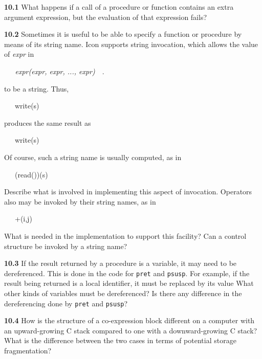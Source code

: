 \textbf{10.1 }What happens if a call of a procedure or function
contains an extra argument expression, but the evaluation of that
expression fails?


\textbf{10.2 }Sometimes it is useful to be able to specify a function
or procedure by means of its string name. Icon supports
{\textquotedbl}string invocation,{\textquotedbl} which allows the
value of \textit{expr} in

{\ttfamily\mdseries
\textit{\ \ \ expr(expr,
expr, ..., expr)}\ \ .}

\noindent to be a string. Thus,

{\ttfamily\mdseries
\ \ \ {\textquotedbl}write{\textquotedbl}(s)}

\noindent produces the same result as

{\ttfamily\mdseries
\ \ \ write(s)}

Of course, such a string name is usually computed, as in

{\ttfamily\mdseries
\ \ \ (read())(s)}


Describe what is involved in implementing this aspect of
invocation. Operators also may be invoked by their string names, as in

{\ttfamily\mdseries
\ \ \ {\textquotedbl}+{\textquotedbl}(i,j)}


What is needed in the implementation to support this facility? Can a
control structure be invoked by a string name?


\textbf{10.3 }If the result returned by a procedure is a variable, it
may need to be dereferenced. This is done in the code for
\texttt{pret} and \texttt{psusp}. For example, if the result being
returned is a local identifier, it must be replaced by its value What
other kinds of variables must be dereferenced? Is there any difference
in the dereferencing done by \texttt{pret} and \texttt{psusp}?


\textbf{10.4 }How is the structure of a co-expression block different
on a computer with an upward-growing C stack compared to one with a
downward-growing C stack? What is the difference between the two cases
in terms of potential storage fragmentation?

